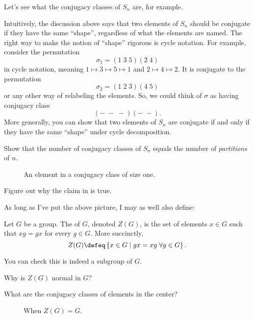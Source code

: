 Let's see what the conjugacy classes of $S_n$ are, for example.
\begin{example}
	Intuitively, the discussion above says that two elements of $S_n$ should
	be conjugate if they have the same ``shape'', regardless of what the elements are named.
	The right way to make the notion of ``shape'' rigorous is cycle notation.
	For example, consider the permutation
	\[ \sigma_1 = (1 \; 3 \; 5)(2 \; 4) \]
	in cycle notation, meaning $1 \mapsto 3 \mapsto 5 \mapsto 1$ and $2 \mapsto 4 \mapsto 2$.
	It is conjugate to the permutation
	\[ \sigma_2 = (1 \; 2 \; 3)(4 \; 5) \]
	or any other way of relabeling the elements.
	So, we could think of $\sigma$ as having conjugacy class
	\[ (- \; - \; -)(- \; -). \]
	More generally, you can show that two elements of $S_n$ are conjugate
	if and only if they have the same ``shape'' under cycle decomposition.
\end{example}
\begin{ques}
	Show that the number of conjugacy classes of $S_n$
	equals the number of \emph{partitions} of $n$.
\end{ques}

\begin{figure}[ht]
	\centering
	\caption{An element in a conjugacy class of size one.}
	\label{fig:snsd_conjugation}
\end{figure}
\begin{ques}
	Figure out why the claim in  is true.
\end{ques}


As long as I've put the above picture, I may as well also define:
\begin{definition}
	Let $G$ be a group.
	The  of $G$, denoted $Z(G)$, is the set of elements $x \in G$
	such that $xg = gx$ for every $g \in G$.
	More succinctly,
	\[ Z(G) \defeq \left\{ x \in G \mid gx=xg \; \forall g \in G \right\}. \]
\end{definition}
You can check this is indeed a subgroup of $G$.
\begin{ques}
	Why is $Z(G)$ normal in $G$?
\end{ques}
\begin{ques}
	What are the conjugacy classes of elements in the center?
\end{ques}

\begin{figure}[ht]
	\centering
	\caption{When $Z(G)=G$.}
\end{figure}

